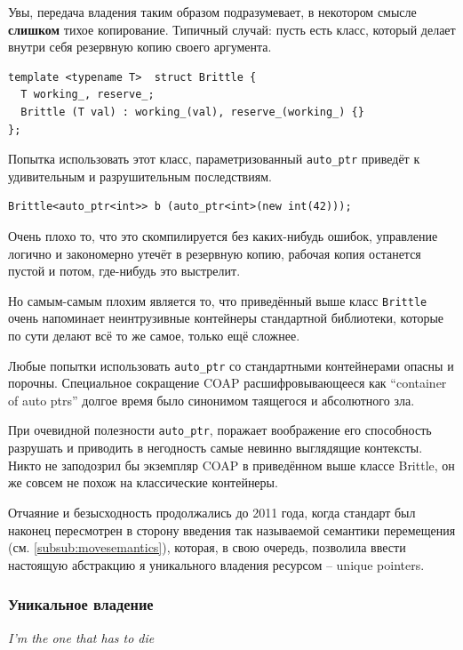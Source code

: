 \documentclass[a4paper,12pt,oneside]{article}
\begin{document}
Увы, передача владения таким образом подразумевает, в некотором смысле \textbf{слишком} тихое копирование. Типичный случай: пусть есть класс, который делает внутри себя резервную копию своего аргумента.

\begin{lstlisting}
template <typename T>  struct Brittle {
  T working_, reserve_;
  Brittle (T val) : working_(val), reserve_(working_) {}
};
\end{lstlisting}

Попытка использовать этот класс, параметризованный \lstinline!auto_ptr! приведёт к удивительным и разрушительным последствиям.

\begin{lstlisting}
Brittle<auto_ptr<int>> b (auto_ptr<int>(new int(42)));
\end{lstlisting}

Очень плохо то, что это скомпилируется без каких-нибудь ошибок, управление логично и закономерно утечёт в резервную копию, рабочая копия останется пустой и потом, где-нибудь это выстрелит.

Но самым-самым плохим является то, что приведённый выше класс \lstinline!Brittle! очень напоминает неинтрузивные контейнеры стандартной библиотеки, которые по сути делают всё то же самое, только ещё сложнее.

Любые попытки использовать \lstinline!auto_ptr! со стандартными контейнерами опасны и порочны. Специальное сокращение COAP расшифровывающееся как ``container of auto ptrs'' долгое время было синонимом таящегося и абсолютного зла.

При очевидной полезности \lstinline!auto_ptr!, поражает воображение его способность разрушать и приводить в негодность самые невинно выглядящие контексты. Никто не заподозрил бы экземпляр COAP в приведённом выше классе Brittle, он же совсем не похож на классические контейнеры.

Отчаяние и безысходность продолжались до 2011 года, когда стандарт был наконец пересмотрен в сторону введения так называемой семантики перемещения (см. \ref{subsub:movesemantics}), которая, в свою очередь, позволила ввести настоящую абстракцию я уникального владения ресурсом -- unique pointers.

\subsubsection{Уникальное владение}\label{subsub:uniqueptrs}

\hfill\textit{I'm the one that has to die}
\end{document}
